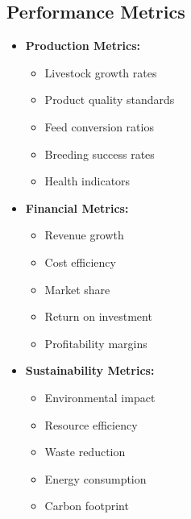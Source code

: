 \subsection{Performance Metrics}
\begin{itemize}
    \item \textbf{Production Metrics:}
    \begin{itemize}
        \item Livestock growth rates
        \item Product quality standards
        \item Feed conversion ratios
        \item Breeding success rates
        \item Health indicators
    \end{itemize}
    
    \item \textbf{Financial Metrics:}
    \begin{itemize}
        \item Revenue growth
        \item Cost efficiency
        \item Market share
        \item Return on investment
        \item Profitability margins
    \end{itemize}
    
    \item \textbf{Sustainability Metrics:}
    \begin{itemize}
        \item Environmental impact
        \item Resource efficiency
        \item Waste reduction
        \item Energy consumption
        \item Carbon footprint
    \end{itemize}
\end{itemize}

